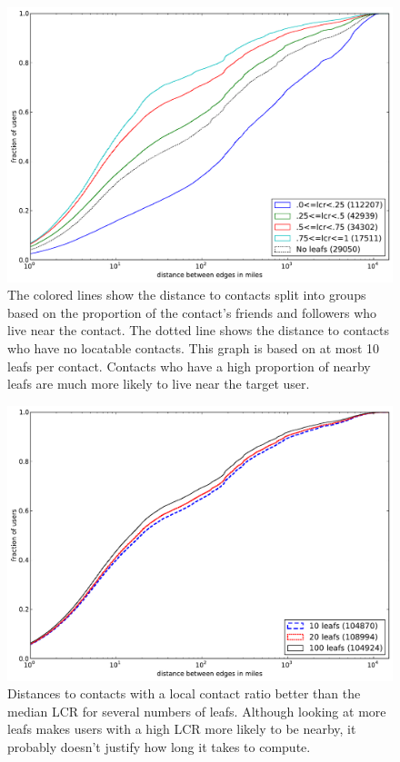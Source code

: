 \documentclass[letterpaper]{article}
\begin{document}
\begin{figure}[tbh]
\centering
\includegraphics[width=\linewidth]{figures/locals_10.pdf}
\caption{
The colored lines show the distance to contacts split into groups based on the
proportion of the contact's friends and followers who live near the contact.
The dotted line shows the distance to contacts who have no locatable contacts.
This graph is based on at most 10 leafs per contact.
Contacts who have a high proportion of nearby leafs are much more likely to
live near the target user.
}
\label{fig:Local10}
\end{figure}

\begin{figure}[tbh]
\centering
\includegraphics[width=\linewidth]{figures/locals_cmp.pdf}
\caption{
    Distances to contacts with a local contact ratio better than the median LCR
    for several numbers of leafs.
    Although looking at more leafs makes users with a high LCR more likely to
    be nearby, it probably doesn't justify how long it takes to compute.
}
\label{fig:LocalCmp}
\end{figure}
\end{document}
